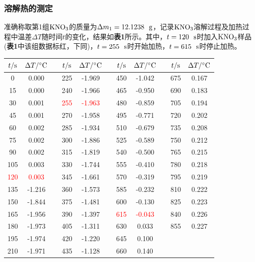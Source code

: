 \documentclass[12pt]{article}
\begin{document}
\subsubsection{溶解热的测定} 
 准确称取第1组$\rm KNO_{3}$的质量为$\Delta m_{1}=12.1238\ \ {\rm g}$，记录$\rm KNO_{3}$溶解过程及加热过程中温差$\Delta T$随时间$t$的变化，结果如\textbf{表1}所示。其中，$t=120\ \ {\rm s}$时加入$\rm KNO_{3}$样品(\textbf{表1}中该组数据标红，下同)，$t=255\ \ {\rm s}$时开始加热，$t=615\ \ {\rm s}$时停止加热。
\begin{table}[h]
	\centering
	\begin{tabular}{ccccccccccc}
		\toprule
		$t/{\rm s}$ & $\Delta T/{\rm ^{\circ}C}$ & & $t/{\rm s}$ & $\Delta T/{\rm ^{\circ}C}$& & 	$t/{\rm s}$ & $\Delta T/{\rm ^{\circ}C}$ & & $t/{\rm s}$ & $\Delta T/{\rm ^{\circ}C}$ \\
		\midrule
		0   & 0.000  &  & 225 & -1.969 &  & 450 & -1.042 &  & 675 & 0.167 \\
		15  & 0.000  &  & 240 & -1.966 &  & 465 & -0.950 &  & 690 & 0.183 \\
		30  & 0.001  &  & \textcolor{red}{255} & \textcolor{red}{-1.963} &  & 480 & -0.859 &  & 705 & 0.194 \\
		45  & 0.001  &  & 270 & -1.958 &  & 495 & -0.771 &  & 720 & 0.202 \\
		60  & 0.002  &  & 285 & -1.934 &  & 510 & -0.679 &  & 735 & 0.208 \\
		75  & 0.002  &  & 300 & -1.886 &  & 525 & -0.589 &  & 750 & 0.212 \\
		90  & 0.002  &  & 315 & -1.819 &  & 540 & -0.500 &  & 765 & 0.215 \\
		105 & 0.003  &  & 330 & -1.744 &  & 555 & -0.410 &  & 780 & 0.218 \\
		\textcolor{red}{120} & \textcolor{red}{0.003}  &  & 345 & -1.661 &  & 570 & -0.319 &  & 795 & 0.219 \\
		135 & -1.216 &  & 360 & -1.573 &  & 585 & -0.232 &  & 810 & 0.222 \\
		150 & -1.844 &  & 375 & -1.481 &  & 600 & -0.130 &  & 825 & 0.223 \\
		165 & -1.956 &  & 390 & -1.397 &  & \textcolor{red}{615} & \textcolor{red}{-0.043} &  & 840 & 0.226 \\
		180 & -1.973 &  & 405 & -1.311 &  & 630 & 0.033  &  & 855 & 0.227 \\
		195 & -1.974 &  & 420 & -1.220 &  & 645 & 0.100  &  &     &       \\
		210 & -1.971 &  & 435 & -1.128 &  & 660 & 0.140  &  &     &      \\
		\bottomrule
	\end{tabular}
\end{table}
\par
\end{document}
